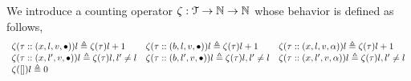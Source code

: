 We introduce a counting operator $\mathtt{\zeta} : \mathcal{T} \to \mathbb{N} \to \mathbb{N}$ whose behavior is defined as follows,
\[
\begin{array}{lll}
\mathtt{\zeta}(\mathtt{\tau} :: (x, l, v, \bullet) ) l \triangleq \mathtt{\zeta}(\mathtt{\tau}) l + 1
&
\mathtt{\zeta}(\mathtt{\tau}  ::(b, l, v, \bullet) ) l \triangleq \mathtt{\zeta}(\mathtt{\tau}) l + 1
&
\mathtt{\zeta}(\mathtt{\tau}  :: (x, l, v, \alpha) ) l \triangleq \mathtt{\zeta}(\mathtt{\tau}) l + 1
\\
\mathtt{\zeta}(\mathtt{\tau}  :: (x, l', v, \bullet) ) l \triangleq \mathtt{\zeta}(\mathtt{\tau} ) l, l' \neq l
&
\mathtt{\zeta}(\mathtt{\tau}  :: (b, l', v, \bullet) ) l \triangleq \mathtt{\zeta}(\mathtt{\tau} ) l, l' \neq l
&
\mathtt{\zeta}(\mathtt{\tau}  :: (x, l', v, \alpha)) l \triangleq \mathtt{\zeta}(\mathtt{\tau} ) l, l' \neq l
\\
\mathtt{\zeta}({[]}) l \triangleq 0
&&
\end{array}
\]
